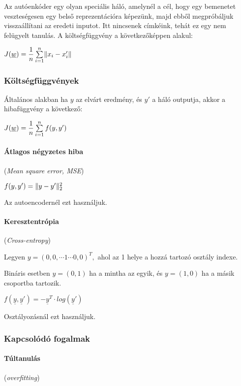 Az autóenkóder egy olyan speciális háló, amelynél a cél, hogy 
egy bemenetet veszteségesen egy belső reprezentációra képezünk,
majd ebből megpróbáljuk visszaállítani az eredeti inputot.
Itt nincsenek címkéink, tehát ez egy nem felügyelt tanulás.
A költségfüggvény a következőképpen alakul:


$ J(\underline{w}) = \dfrac{1}{n} \sum\limits_{{i}=1}^{n}\lVert x_i - x_i'\rVert $




\subsubsection{Költségfüggvények}

Általános alakban ha $ y $ az elvárt eredmény, és $ y' $ a háló
outputja, akkor a hibafüggvény a következő:

$ J(\underline{w}) = \dfrac{1}{n} \sum\limits_{{i}=1}^{n} f(y, y') $


\paragraph{Átlagos négyzetes hiba} (\textit{Mean square error, MSE})


$ f(y, y') = \lVert y - y'\rVert_2^2 $

\noindent
Az autoencodernél ezt használjuk.


\paragraph{Keresztentrópia} (\textit{Cross-entropy})

Legyen $ y = (0, 0, \cdots 1 \cdots 0, 0)^T, $ 
ahol az 1 helye a hozzá tartozó osztály indexe.

Bináris esetben $ y=(0, 1) $ ha a mintha az egyik, és
$ y=(1, 0) $ ha a másik csoportba tartozik.

$ f(\underline{y}, \underline{y}') = - \underline{y}^T \cdot log(\underline{y}') $

\noindent
Osztályozásnál ezt használjuk.



\subsubsection{Kapcsolódó fogalmak}


\paragraph{Túltanulás} (\textit{overfitting})

